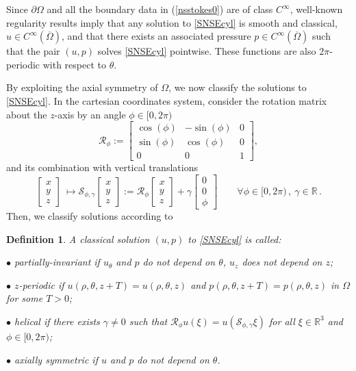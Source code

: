\documentclass[a4paper,11pt]{amsart}
\newtheorem{definition}{Definition}[section]
\numberwithin{equation}{section}
\numberwithin{figure}{section}
\newcommand{\R}{\mathbb{R}}
\def\eq#1{(\ref{#1})}
\begin{document}
	Since $\partial \Omega$ and all the boundary data in \eq{nsstokes0} are of class $C^{\infty}$, well-known regularity results
	\cite[Theorem IX.5.2]{galdi2011introduction} imply that any solution to \eqref{SNSEcyl} is smooth and classical, $u\in C^\infty(\overline{\Omega})$,
	and that there exists an associated pressure $p \in C^\infty(\overline{\Omega})$ such that the pair $(u,p)$ solves \eqref{SNSEcyl}
	pointwise. These functions are also $2\pi$-periodic with respect to $\theta$.\par
    By exploiting the axial symmetry of $\Omega$, we now classify the solutions to \eqref{SNSEcyl}.
	In the cartesian coordinates system, consider the rotation matrix about the $z$-axis by an angle $\phi\in[0,2\pi)$
	\begin{equation} \label{rotmat}
		\mathcal{R}_\phi :=
		\begin{bmatrix}
			\cos(\phi) & -\sin(\phi)  & 0\\[0.2cm]
			\sin(\phi) & \cos(\phi)   & 0\\[0.2cm]
			0          &    0         & 1
		\end{bmatrix},
	\end{equation}
	and its combination with vertical translations
	$$
	\begin{bmatrix}
		x\\
		y\\
		z
	\end{bmatrix}
	\ \mapsto \mathcal{S}_{\phi,\gamma}\begin{bmatrix}
		x\\
		y\\
		z
	\end{bmatrix}
	:=\mathcal{R}_\phi\begin{bmatrix}
		x\\
		y\\
		z
	\end{bmatrix}+\gamma\begin{bmatrix}
		0\\
		0\\
		\phi
	\end{bmatrix}
	\qquad\forall\phi\in[0,2\pi)\, ,\ \gamma \in\R\, .
	$$
	Then, we classify solutions according to
	
	\begin{definition}\label{kindsolutions}
		A classical solution $(u,p)$ to \eqref{SNSEcyl} is called:\par
		$\bullet$ partially-invariant if $u_\theta$ and $p$ do not depend on $\theta$, $u_z$ does not depend on $z$;\par
		$\bullet$ $z$-periodic if $u(\rho,\theta,z+T)=u(\rho,\theta,z)$ and $p(\rho,\theta,z+T)=p(\rho,\theta,z)$
		in $\Omega$ for some $T>0$;\par
		$\bullet$ helical if there exists $\gamma\neq0$ such that $\mathcal{R}_\phi u(\xi)=u(\mathcal{S}_{\phi,\gamma}\xi)$ for all $\xi\in\R^3$ and $\phi\in[0,2\pi)$;\par
		$\bullet$ axially symmetric if $u$ and $p$ do not depend on $\theta$.
	\end{definition}
	
\end{document}
